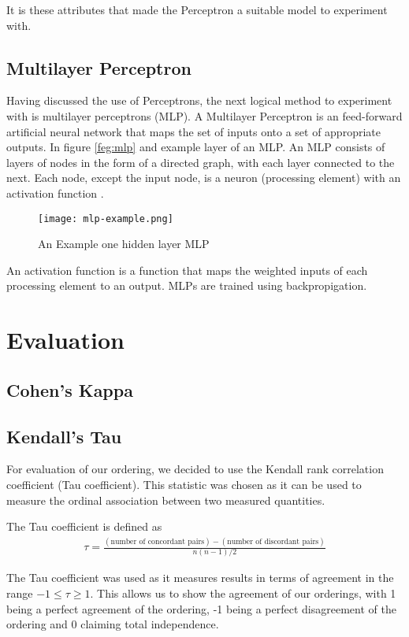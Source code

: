\documentclass[bsc,frontabs,twoside,singlespacing,parskip,deptreport]{infthesis}     %
\begin{document}
It is these attributes that made the Perceptron a suitable model to experiment with.
\subsection{Multilayer Perceptron}
Having discussed the use of Perceptrons, the next logical method to experiment with is multilayer perceptrons (MLP).
A Multilayer Perceptron is an feed-forward artificial neural network that maps the set of inputs
onto a set of appropriate outputs.
In figure \ref{feg:mlp} and example layer of an MLP.
An MLP consists of layers of  nodes in the form of a directed graph, with each layer connected to the next.
Each node, except the input node, is a neuron (processing element) with an activation function \cite{}.%

\begin{figure}
  \centering
  \texttt{[image: mlp-example.png]}
  \caption{An Example one hidden layer MLP \cite{scikit-learn}}
  \label{fig:mlp}
\end{figure}

An activation function is a function that maps the weighted inputs of each processing element to an output.
MLPs are trained using backpropigation.

\section{Evaluation}
\subsection{Cohen's Kappa}
\subsection{Kendall's Tau}
For evaluation of our ordering, we decided to use the Kendall rank correlation coefficient (Tau coefficient).
This statistic was chosen as it can be used to measure the ordinal association between two measured quantities.


The Tau coefficient is defined as
\begin{eqnarray}
  \tau=\frac{(\text{number of concordant pairs})-(\text{number of discordant pairs})}{n(n-1)/2}\nonumber
\end{eqnarray}\cite{abdi2007kendall}

The Tau coefficient was used as it measures results in terms of agreement in the range $-1 \leq \tau \geq 1$.
This allows us to show the agreement of our orderings, with 1 being a perfect agreement of the ordering, -1 being a perfect disagreement of the ordering and 0 claiming
total independence.
\end{document}
